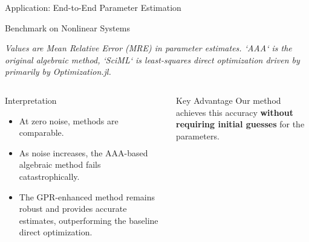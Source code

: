 \documentclass[aspectratio=169]{beamer}
\begin{document}
\begin{frame}[shrink]{Application: End-to-End Parameter Estimation}
    \begin{block}{Benchmark on Nonlinear Systems}
        \centering
        \small
        
        \vspace{0.5em}
        
        \footnotesize
        \textit{Values are Mean Relative Error (MRE) in parameter estimates. `AAA` is the original algebraic method, `SciML` is least-squares direct optimization driven by primarily by Optimization.jl.}
    \end{block}
    
    \begin{columns}[T]
        \begin{column}{0.6\textwidth}
            \begin{alertblock}{Interpretation}
                \footnotesize
                \begin{itemize}
                    \item At zero noise, methods are comparable.
                    \item As noise increases, the AAA-based algebraic method fails catastrophically.
                    \item The GPR-enhanced method remains robust and provides accurate estimates, outperforming the baseline direct optimization.
                \end{itemize}
            \end{alertblock}
        \end{column}
        \begin{column}{0.4\textwidth}
             \begin{block}{Key Advantage}
                \small
                 Our method achieves this accuracy \textbf{without requiring initial guesses} for the parameters.
             \end{block}
        \end{column}
    \end{columns}
\end{frame}
\end{document}
